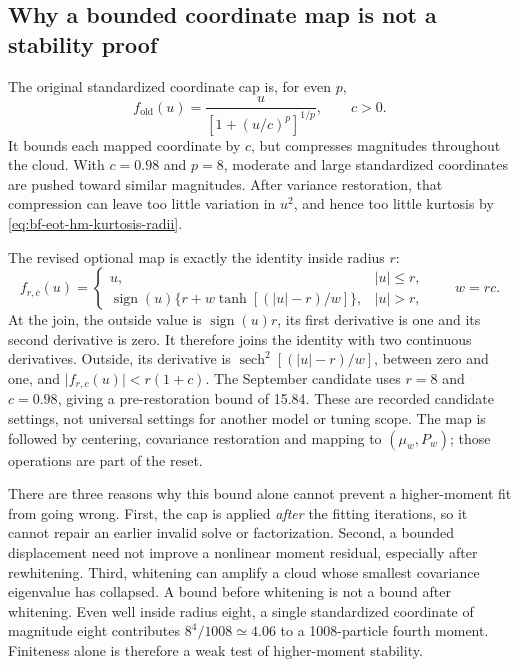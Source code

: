 \subsection{Why a bounded coordinate map is not a stability proof}
\label{sec:bf-eot-hm-cap-stability}

The original standardized coordinate cap is, for even \(p\),
\begin{equation}
 f_{\mathrm{old}}(u)=\frac{u}{[1+(u/c)^p]^{1/p}},\qquad c>0.
 \label{eq:bf-eot-hm-original-cap}
\end{equation}
It bounds each mapped coordinate by \(c\), but compresses magnitudes throughout
the cloud.  With \(c=0.98\) and \(p=8\), moderate and large standardized
coordinates are pushed toward similar magnitudes.  After variance restoration,
that compression can leave too little variation in \(u^2\), and hence too
little kurtosis by \eqref{eq:bf-eot-hm-kurtosis-radii}.

The revised optional map is exactly the identity inside radius \(r\):
\begin{equation}
 f_{r,c}(u)=
 \begin{cases}
 u,& |u|\le r,\\
 \operatorname{sign}(u)\{r+w\tanh[(|u|-r)/w]\},& |u|>r,
 \end{cases}
 \qquad w=rc.
 \label{eq:bf-eot-hm-identity-core-cap}
\end{equation}
At the join, the outside value is \(\operatorname{sign}(u)r\), its first
derivative is one and its second derivative is zero.  It therefore joins the
identity with two continuous derivatives.  Outside, its derivative is
\(\operatorname{sech}^2[(|u|-r)/w]\), between zero and one, and
\(\lvert f_{r,c}(u)\rvert<r(1+c)\).  The September candidate uses \(r=8\)
and \(c=0.98\), giving a pre-restoration bound of 15.84.  These are recorded
candidate settings, not universal settings for another model or tuning scope.
The map is followed by centering, covariance restoration and mapping to
\((\mu_w,P_w)\); those operations are part of the reset.

There are three reasons why this bound alone cannot prevent a higher-moment
fit from going wrong.  First, the cap is applied \emph{after} the fitting
iterations, so it cannot repair an earlier invalid solve or factorization.
Second, a bounded displacement need not improve a nonlinear moment residual,
especially after rewhitening.  Third, whitening can amplify a cloud whose
smallest covariance eigenvalue has collapsed.  A bound before whitening is
not a bound after whitening.  Even well inside radius eight, a single
standardized coordinate of magnitude eight contributes \(8^4/1008\simeq4.06\)
to a 1008-particle fourth moment.  Finiteness alone is therefore a weak test
of higher-moment stability.

